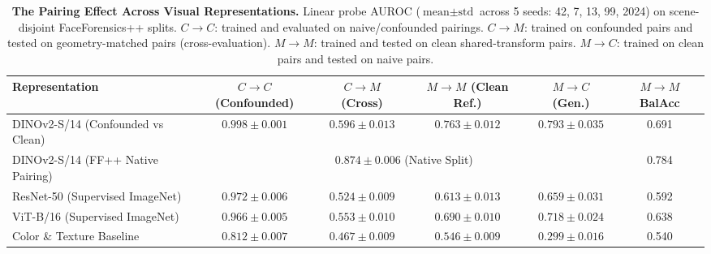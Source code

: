\begin{table}[t]
\centering
\small
\caption{\textbf{The Pairing Effect Across Visual Representations.} Linear probe AUROC ($\text{mean} \pm \text{std}$ across 5 seeds: 42, 7, 13, 99, 2024) on scene-disjoint FaceForensics++ splits. $C\to C$: trained and evaluated on naive/confounded pairings. $C\to M$: trained on confounded pairs and tested on geometry-matched pairs (cross-evaluation). $M\to M$: trained and tested on clean shared-transform pairs. $M\to C$: trained on clean pairs and tested on naive pairs.}
\label{tab:pairing_effect}
\begin{tabular}{lcccc c}
\toprule
\textbf{Representation} & \textbf{$C \to C$ (Confounded)} & \textbf{$C \to M$ (Cross)} & \textbf{$M \to M$ (Clean Ref.)} & \textbf{$M \to C$ (Gen.)} & \textbf{$M \to M$ BalAcc} \\
\midrule
DINOv2-S/14 (Confounded vs Clean) & $0.998 \pm 0.001$ & $0.596 \pm 0.013$ & $0.763 \pm 0.012$ & $0.793 \pm 0.035$ & 0.691 \\
DINOv2-S/14 (FF++ Native Pairing) & \multicolumn{4}{c}{$0.874 \pm 0.006$ (Native Split)} & 0.784 \\
ResNet-50 (Supervised ImageNet) & $0.972 \pm 0.006$ & $0.524 \pm 0.009$ & $0.613 \pm 0.013$ & $0.659 \pm 0.031$ & 0.592 \\
ViT-B/16 (Supervised ImageNet) & $0.966 \pm 0.005$ & $0.553 \pm 0.010$ & $0.690 \pm 0.010$ & $0.718 \pm 0.024$ & 0.638 \\
Color \& Texture Baseline & $0.812 \pm 0.007$ & $0.467 \pm 0.009$ & $0.546 \pm 0.009$ & $0.299 \pm 0.016$ & 0.540 \\
\bottomrule
\end{tabular}
\end{table}


